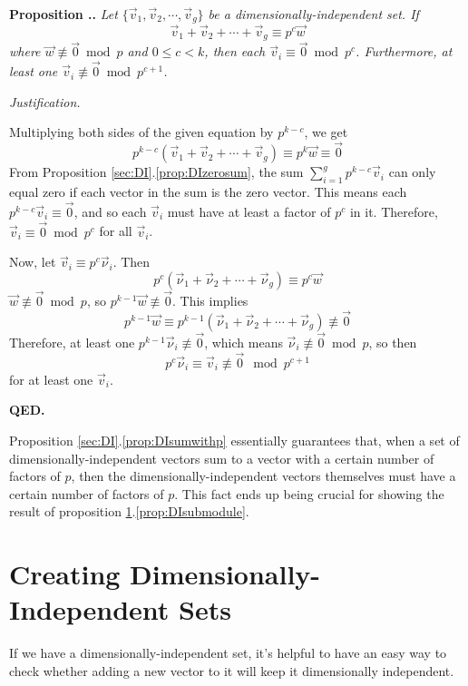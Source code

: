\documentclass[a4paper, 12pt, reqno]{amsart}
\newcounter{propcounter}[section]
\newenvironment{proposition}[1]
{
	\refstepcounter{propcounter}
	\textbf{Proposition \thesection.\thepropcounter.} \emph{#1}
	
	\emph{Justification.}
}
{
	\textbf{QED.} \\
}
\begin{document}
		\begin{proposition}{Let $\{\vec{v}_1, \vec{v}_2, \cdots, \vec{v}_g\}$ be a dimensionally-independent set. If
		\[
			\vec{v}_1 + \vec{v}_2 + \cdots + \vec{v}_g \equiv p^c\vec{w}
		\]
		where $\vec{w} \not\equiv \vec{0} \bmod{p}$ and $0 \leq c < k$, then each $\vec{v}_i \equiv \vec{0} \bmod{p^c}$. Furthermore, at least one 
		$\vec{v}_i \not\equiv \vec{0} \bmod{p^{c+1}}$.}
			\label{prop:DIsumwithp}
			Multiplying both sides of the given equation by $p^{k-c}$, we get
			\[
				p^{k-c}(\vec{v}_1 + \vec{v}_2 + \cdots + \vec{v}_g) \equiv p^k\vec{w} \equiv \vec{0}
			\]
			From Proposition \ref{sec:DI}.\ref{prop:DIzerosum}, the sum $\sum_{i=1}^{g} p^{k-c}\vec{v}_i$ can only equal zero if each vector in the sum is the zero vector. 
			This means each $p^{k-c}\vec{v}_i \equiv \vec{0}$, and so each $\vec{v}_i$ must have at least a factor of $p^c$ in it. Therefore, 
			$\vec{v}_i \equiv \vec{0} \bmod{p^c}$ for all $\vec{v}_i$.
			
			Now, let $\vec{v}_i \equiv p^c\vec{\nu}_i$. Then
			\[
				p^c(\vec{\nu}_1 + \vec{\nu}_2 + \cdots + \vec{\nu}_g) \equiv p^c\vec{w}
			\]
			$\vec{w} \not\equiv \vec{0} \bmod{p}$, so $p^{k-1}\vec{w} \not\equiv \vec{0}$. This implies
			\[
				p^{k-1}\vec{w} \equiv p^{k-1}(\vec{\nu}_1 + \vec{\nu}_2 + \cdots + \vec{\nu}_g) \not\equiv \vec{0}
			\]
			Therefore, at least one $p^{k-1}\vec{\nu}_i \not\equiv \vec{0}$, which means $\vec{\nu}_i \not\equiv \vec{0} \bmod{p}$, so then
			\[
				p^c\vec{\nu}_i \equiv \vec{v}_i \not\equiv \vec{0} \mod{p^{c+1}}
			\]
			for at least one $\vec{v}_i$.
		\end{proposition}
		
		Proposition \ref{sec:DI}.\ref{prop:DIsumwithp} essentially guarantees that, when a set of dimensionally-independent vectors sum to a vector with a certain number
		of factors of $p$, then the dimensionally-independent vectors themselves must have a certain number of factors of $p$. This fact ends up being crucial for showing
		the result of proposition \ref{sec:CDIS}.\ref{prop:DIsubmodule}.
		
	\section{Creating Dimensionally-Independent Sets}
		\label{sec:CDIS}
		If we have a dimensionally-independent set, it's helpful to have an easy way to check whether adding a new vector to it will keep it dimensionally independent.
		
\end{document}
